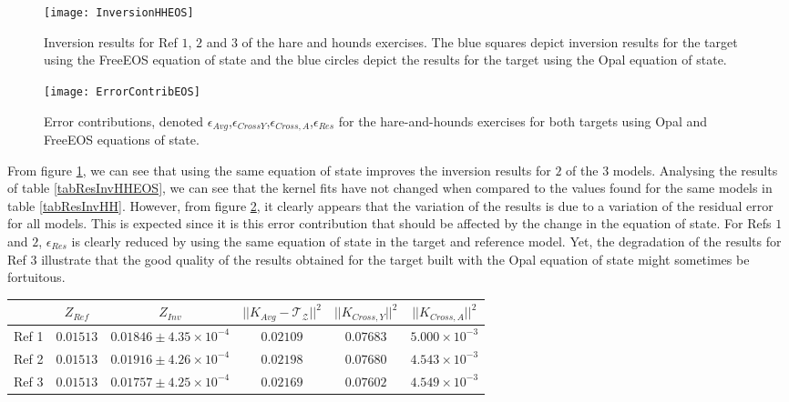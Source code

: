 \documentclass[a4paper,fleqn,usenatbib]{mnras}
\begin{document}
 \begin{figure}
	\centering
		\texttt{[image: InversionHHEOS]}
	\caption{Inversion results for Ref $1$, $2$ and $3$ of the hare and hounds exercises. The blue squares depict inversion results for the target using the FreeEOS equation of state and the blue circles depict the results for the target using the Opal equation of state.}
		\label{figResHHEOS}
\end{figure} 

 \begin{figure}
	\centering
		\texttt{[image: ErrorContribEOS]}
	\caption{Error contributions, denoted $\epsilon_{Avg}$,$\epsilon_{CrossY}$,$\epsilon_{Cross,A}$,$\epsilon_{Res}$ for the hare-and-hounds exercises for both targets using Opal and FreeEOS equations of state. }
		\label{figErrorContribEOS}
\end{figure} 

From figure \ref{figResHHEOS}, we can see that using the same equation of state improves the inversion results for $2$ of the $3$ models. Analysing the results of table \ref{tabResInvHHEOS}, we can see that the kernel fits have not changed when compared to the values found for the same models in table \ref{tabResInvHH}. However, from figure \ref{figErrorContribEOS}, it clearly appears that the variation of the results is due to a variation of the residual error for all models. This is expected since it is this error contribution that should be affected by the change in the equation of state. For Refs $1$ and $2$, $\epsilon_{Res}$ is clearly reduced by using the same equation of state in the target and reference model. Yet, the degradation of the results for Ref $3$ illustrate that the good quality of the results obtained for the target built with the Opal equation of state might sometimes be fortuitous.

\begin{table*}
\caption{Inversion results for the hare-and-hounds exercises for the target built with the FreeEOS equation of state.}
\label{tabResInvHHEOS}
  \centering
\begin{tabular}{r | c | c | c | c |c }
\hline
& $Z_{Ref}$  & $Z_{Inv}$ & $\vert \vert K_{Avg}-\mathcal{T}_{\mathcal{Z}} \vert \vert^{2}$ & $\vert \vert K_{Cross,Y} \vert \vert^{2}$ & $\vert \vert K_{Cross,A} \vert \vert^{2}$ \\ \hline
Ref 1 & $0.01513$ & $0.01846\pm 4.35 \times 10^{-4}$ & $0.02109$ & $0.07683$ & $5.000\times 10^{-3}$\\  
Ref 2 & $0.01513$&  $0.01916\pm 4.26 \times 10^{-4}$ & $0.02198$& $0.07680$& $4.543\times 10^{-3}$\\  
Ref 3 & $0.01513$& $0.01757\pm 4.25 \times 10^{-4}$ & $0.02169$& $0.07602$ & $4.549 \times 10^{-3}$ \\
\hline
\end{tabular}
\end{table*}
\end{document}
